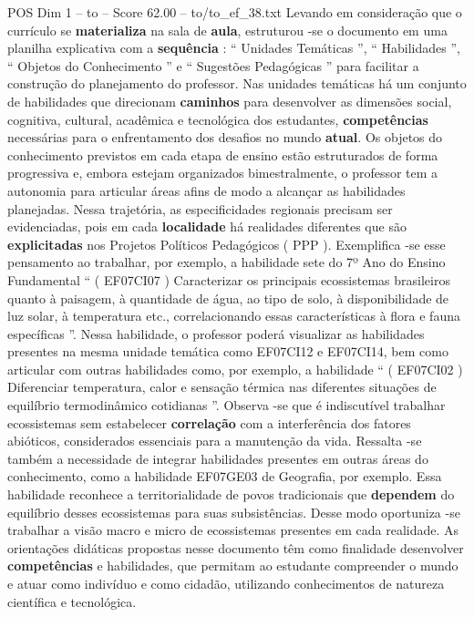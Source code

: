 \begin{textsample}{POS Dim 1 – to – Score 62.00 – to/to\_ef\_38.txt}
Levando em consideração que o currículo se \textbf{materializa} na sala de \textbf{aula}, estruturou -se o documento em uma planilha explicativa com a \textbf{sequência} : “ Unidades Temáticas ”, “ Habilidades ”, “ Objetos do Conhecimento ” e “ Sugestões Pedagógicas ” para facilitar a construção do planejamento do professor.
Nas unidades temáticas há um conjunto de habilidades que direcionam \textbf{caminhos} para desenvolver as dimensões social, cognitiva, cultural, acadêmica e tecnológica dos estudantes, \textbf{competências} necessárias para o enfrentamento dos desafios no mundo \textbf{atual}.
Os objetos do conhecimento previstos em cada etapa de ensino estão estruturados de forma progressiva e, embora estejam organizados bimestralmente, o professor tem a autonomia para articular áreas afins de modo a alcançar as habilidades planejadas.
Nessa trajetória, as especificidades regionais precisam ser evidenciadas, pois em cada \textbf{localidade} há realidades diferentes que são \textbf{explicitadas} nos Projetos Políticos Pedagógicos ( PPP ).
Exemplifica -se esse pensamento ao trabalhar, por exemplo, a habilidade sete do 7º Ano do Ensino Fundamental “ ( EF07CI07 ) Caracterizar os principais ecossistemas brasileiros quanto à paisagem, à quantidade de água, ao tipo de solo, à disponibilidade de luz solar, à temperatura etc., correlacionando essas características à flora e fauna específicas ”.
Nessa habilidade, o professor poderá visualizar as habilidades presentes na mesma unidade temática como EF07CI12 e EF07CI14, bem como articular com outras habilidades como, por exemplo, a habilidade “ ( EF07CI02 ) Diferenciar temperatura, calor e sensação térmica nas diferentes situações de equilíbrio termodinâmico cotidianas ”.
Observa -se que é indiscutível trabalhar ecossistemas sem estabelecer \textbf{correlação} com a interferência dos fatores abióticos, considerados essenciais para a manutenção da vida.
Ressalta -se também a necessidade de integrar habilidades presentes em outras áreas do conhecimento, como a habilidade EF07GE03 de Geografia, por exemplo.
Essa habilidade reconhece a territorialidade de povos tradicionais que \textbf{dependem} do equilíbrio desses ecossistemas para suas subsistências.
Desse modo oportuniza -se trabalhar a visão macro e micro de ecossistemas presentes em cada realidade.
As orientações didáticas propostas nesse documento têm como finalidade desenvolver \textbf{competências} e habilidades, que permitam ao estudante compreender o mundo e atuar como indivíduo e como cidadão, utilizando conhecimentos de natureza científica e tecnológica.

\end{textsample}
